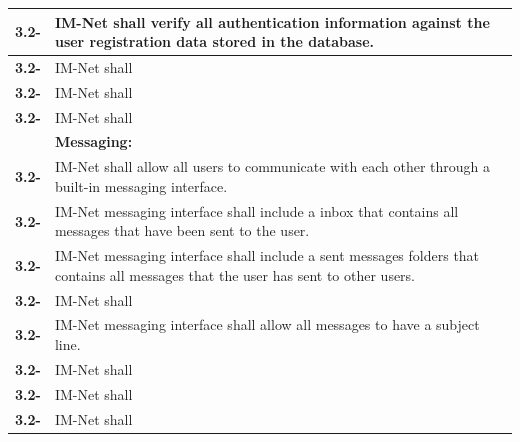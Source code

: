 \documentclass[letterpaper,12pt]{article}
\newcounter{rcounter}						%
\newcommand\rnumber{\stepcounter{rcounter}\arabic{rcounter}}
\begin{document}
{\begin{center}
\begin{tabular}{|l|p{6in}|}
\textbf{3.2-\rnumber} & IM-Net shall verify all authentication information against the user registration data stored in the database. \\ 
\hline 
\textbf{3.2-\rnumber} & IM-Net shall  \\ 
\hline 
\textbf{3.2-\rnumber} & IM-Net shall  \\ 
\hline 
\textbf{3.2-\rnumber} & IM-Net shall  \\ 
\hline 
& \textbf{Messaging:} \\
\hline
\textbf{3.2-\rnumber} & IM-Net shall allow all users to communicate with each other through a built-in messaging interface. \\ 
\hline 
\textbf{3.2-\rnumber} & IM-Net messaging interface shall include a inbox that contains all messages that have been sent to the user. \\ 
\hline 
\textbf{3.2-\rnumber} & IM-Net messaging interface shall include a sent messages folders that contains all messages that the user has sent to other users.  \\ 
\hline 
\textbf{3.2-\rnumber} & IM-Net shall  \\ 
\hline 
\textbf{3.2-\rnumber} & IM-Net messaging interface shall allow all messages to have a subject line. \\ 
\hline 
\textbf{3.2-\rnumber} & IM-Net shall  \\ 
\hline 
\textbf{3.2-\rnumber} & IM-Net shall  \\ 
\hline 
\textbf{3.2-\rnumber} & IM-Net shall  \\ 
\hline 



\end{tabular} 
\end{center}

}
\end{document}
